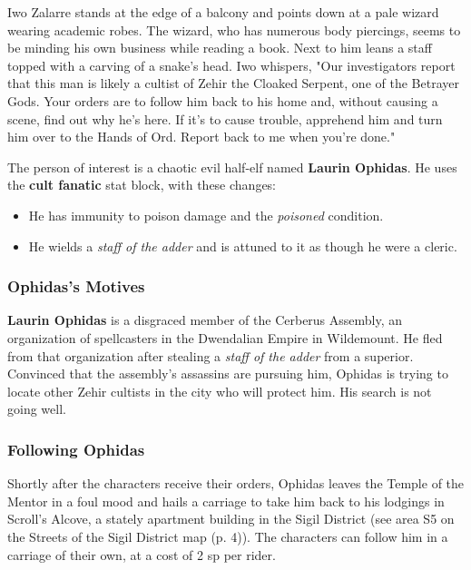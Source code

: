 \documentclass[a4paper, 11pt, bg=full, twocolumn, nooutline]{dndbook}
\begin{document}
\begin{DndReadAloud}
Iwo Zalarre stands at the edge of a balcony and points down at a pale wizard wearing academic robes. The wizard, who has numerous body piercings, seems to be minding his own business while reading a book. Next to him leans a staff topped with a carving of a snake's head.
Iwo whispers, "Our investigators report that this man is likely a cultist of Zehir the Cloaked Serpent, one of the Betrayer Gods. Your orders are to follow him back to his home and, without causing a scene, find out why he's here. If it's to cause trouble, apprehend him and turn him over to the Hands of Ord. Report back to me when you're done."
\end{DndReadAloud}

The person of interest is a chaotic evil half-elf named \textbf{Laurin Ophidas}. He uses the \textbf{cult fanatic} stat block, with these changes:

\begin{itemize}
\item He has immunity to poison damage and the \textit{poisoned} condition.
\item He wields a \textit{staff of the adder} and is attuned to it as though he were a cleric.
\end{itemize}

\subsubsection{Ophidas's Motives}

\textbf{Laurin Ophidas} is a disgraced member of the Cerberus Assembly, an organization of spellcasters in the Dwendalian Empire in Wildemount. He fled from that organization after stealing a \textit{staff of the adder} from a superior. Convinced that the assembly's assassins are pursuing him, Ophidas is trying to locate other Zehir cultists in the city who will protect him. His search is not going well.

\subsubsection{Following Ophidas}

Shortly after the characters receive their orders, Ophidas leaves the Temple of the Mentor in a foul mood and hails a carriage to take him back to his lodgings in Scroll's Alcove, a stately apartment building in the Sigil District (see area S5 on the Streets of the Sigil District map (p. 4)). The characters can follow him in a carriage of their own, at a cost of 2 sp per rider.
\end{document}
